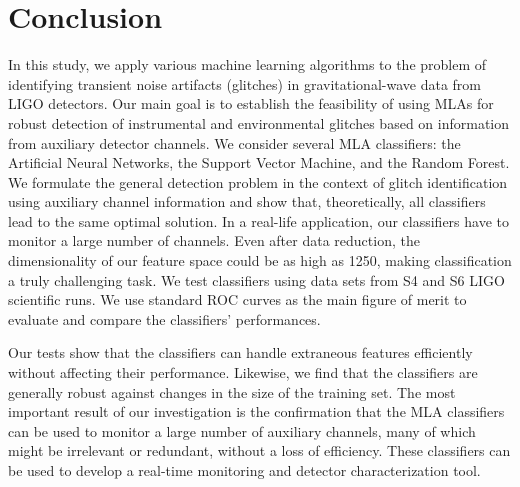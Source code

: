 \documentclass[prd, twocolumn, lengthcheck, superscriptaddress, showpacs, letterpaper, nofootinbib]{revtex4-1}
\begin{document}

\section{Conclusion}
\label{sec:conclusion}

In this study, we apply various machine learning algorithms to the problem of identifying transient noise artifacts (glitches) in gravitational-wave data from \ac{LIGO} detectors. Our main goal is to establish the feasibility of using \ac{MLA}s for robust detection of instrumental and environmental glitches based on information from auxiliary detector channels. We consider several \ac{MLA} classifiers: the Artificial Neural Networks, the Support Vector Machine, and the Random Forest. We formulate the general detection problem in the context of glitch identification using auxiliary channel information and show that, theoretically, all classifiers lead to the same optimal solution. In a real-life application, our classifiers have to monitor a large number of channels. Even after data reduction, the dimensionality of our feature space could be as high as 1250,  making classification a truly challenging task. We test classifiers using data sets from S4 and S6 LIGO scientific runs. We use standard \ac{ROC} curves as the main figure of merit to evaluate and  compare the classifiers' performances.

Our tests show that the classifiers can handle extraneous features efficiently without affecting their performance. Likewise, we find that the classifiers are generally robust against changes in the size of the training set. The most important result of our investigation is the confirmation that the \ac{MLA} classifiers can be used to monitor a large number of auxiliary channels, many of which might be irrelevant or redundant, without a loss of efficiency. These classifiers can be used to develop a real-time monitoring and detector characterization tool. 
\end{document}
